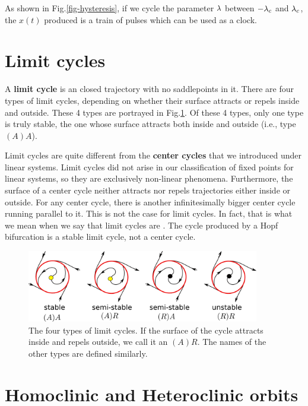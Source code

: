  As shown in Fig.\ref{fig-hysteresis},
 if we cycle the parameter $\lambda$
 between $-\lambda_c$ and 
 $\lambda_c$, the $x(t)$ produced is a
 train of pulses
 which can be used as a clock.
 


\section{Limit cycles}

A {\bf limit cycle} is an  closed trajectory with no saddlepoints
 in it. There are four types of limit cycles, depending on whether their surface attracts or repels inside and outside.
 These 4 types are portrayed  in Fig.\ref{fig-limit-cycles}. Of these 4 types, only one type
 is truly stable,  the one whose surface attracts both inside and outside (i.e., type $(A)A$).
 
 Limit cycles are quite different from the {\bf center cycles} that we introduced under linear systems.
 Limit cycles did not arise in our classification of fixed points for linear systems, so they are exclusively non-linear phenomena. Furthermore, 
 the surface of a center cycle neither attracts
 nor repels trajectories either inside
 or outside. For any center cycle, 
 there is another infinitesimally bigger
 center cycle  running parallel to it.
 This is not the case for limit cycles.
 In fact, that is what we mean when we say  
 that limit cycles are 
 . The cycle produced 
 by a Hopf bifurcation is a stable limit cycle, not a center cycle.
 

\begin{figure}[h!]
\centering
\includegraphics[width=4in]
{dynamical-sys/limit-cycles.png}
\caption{The four types of limit cycles. If the 
surface of the cycle attracts inside and repels outside,
we call it an $(A)R$. The names of the other types
are defined similarly. }
\label{fig-limit-cycles}
\end{figure}

\section{Homoclinic and Heteroclinic orbits}

